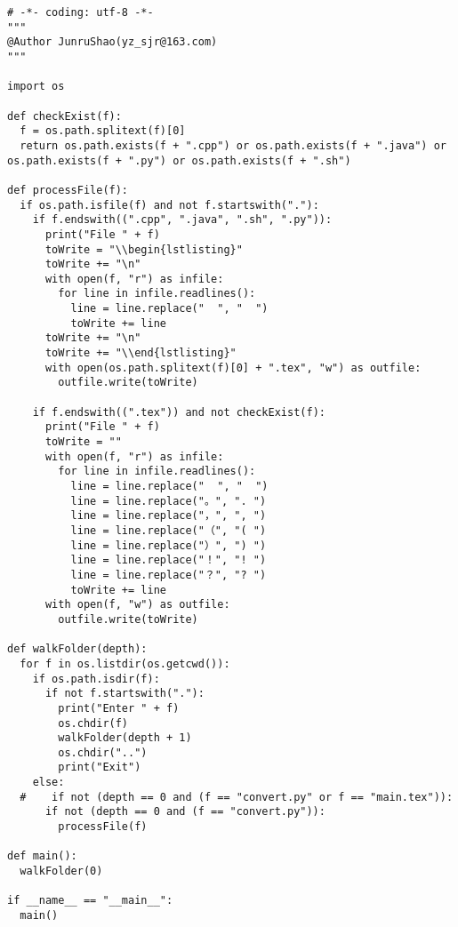 \begin{lstlisting}
# -*- coding: utf-8 -*-
"""
@Author JunruShao(yz_sjr@163.com)
"""

import os

def checkExist(f):
  f = os.path.splitext(f)[0]
  return os.path.exists(f + ".cpp") or os.path.exists(f + ".java") or os.path.exists(f + ".py") or os.path.exists(f + ".sh")

def processFile(f):
  if os.path.isfile(f) and not f.startswith("."):
    if f.endswith((".cpp", ".java", ".sh", ".py")):
      print("File " + f)
      toWrite = "\\begin{lstlisting}"
      toWrite += "\n"
      with open(f, "r") as infile:
        for line in infile.readlines():
          line = line.replace("  ", "  ")
          toWrite += line
      toWrite += "\n"
      toWrite += "\\end{lstlisting}"
      with open(os.path.splitext(f)[0] + ".tex", "w") as outfile:
        outfile.write(toWrite)

    if f.endswith((".tex")) and not checkExist(f):
      print("File " + f)
      toWrite = ""
      with open(f, "r") as infile:
        for line in infile.readlines():
          line = line.replace("  ", "  ")
          line = line.replace("。", ". ")
          line = line.replace("，", ", ")
          line = line.replace("（", "( ")
          line = line.replace("）", ") ")
          line = line.replace("！", "! ")
          line = line.replace("？", "? ")
          toWrite += line
      with open(f, "w") as outfile:
        outfile.write(toWrite)

def walkFolder(depth):
  for f in os.listdir(os.getcwd()):
    if os.path.isdir(f):
      if not f.startswith("."):
        print("Enter " + f)
        os.chdir(f)
        walkFolder(depth + 1)
        os.chdir("..")
        print("Exit")
    else:
  #    if not (depth == 0 and (f == "convert.py" or f == "main.tex")):
      if not (depth == 0 and (f == "convert.py")):
        processFile(f)

def main():
  walkFolder(0)

if __name__ == "__main__":
  main()

\end{lstlisting}